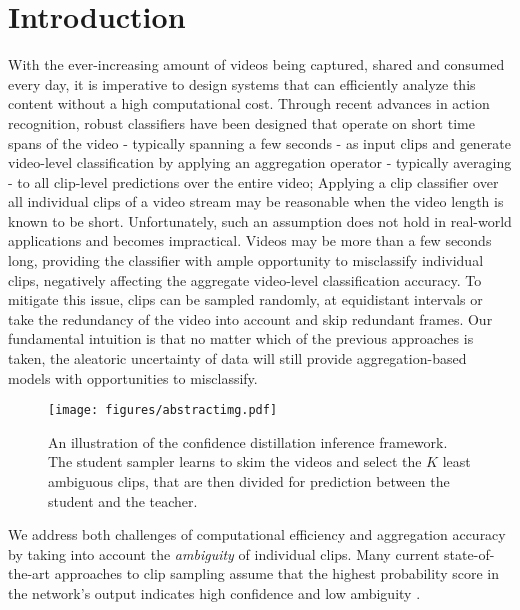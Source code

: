 \documentclass[a4paper,conference]{IEEEtran}
\begin{document}
\IEEEpeerreviewmaketitle



\section{Introduction}
With the ever-increasing amount of videos being captured, shared and consumed every day, it is imperative to design systems that can efficiently analyze this content without a high computational cost. Through recent advances in action recognition, robust classifiers have been designed \cite{Hara_2018_CVPR, tran2015learning, tran2018closer, tran2019video, feichtenhofer2017spatiotemporal, feichtenhofer2019slowfast, feichtenhofer2020x3d} that operate on short time spans of the video - typically spanning a few seconds - as input clips and generate video-level classification by applying an aggregation operator - typically averaging - to all clip-level predictions over the entire video; Applying a clip classifier over all individual clips of a video stream may be reasonable when the video length is known to be short. Unfortunately, such an assumption does not hold in real-world applications and becomes impractical. Videos may be more than a few seconds long, providing the classifier with ample opportunity to misclassify individual clips, negatively affecting the aggregate video-level classification accuracy. To mitigate this issue, clips can be sampled randomly, at equidistant intervals or take the redundancy of the video into account and skip redundant frames. Our fundamental intuition is that no matter which of the previous approaches is taken, the aleatoric uncertainty of data will still provide aggregation-based models with opportunities to misclassify. 

\begin{figure}[t] \centering
    {{\texttt{[image: figures/abstractimg.pdf]}}}\caption{An illustration of the confidence distillation inference framework. The student sampler learns to skim the videos and select the $K$ least ambiguous clips, that are then divided for prediction between the student and the teacher.}\label{fig:abstframework}
\end{figure}

We address both challenges of computational efficiency and aggregation accuracy by taking into account the \textit{ambiguity} of individual clips. Many current state-of-the-art approaches to clip sampling assume that the highest probability score in the network's output indicates high confidence and low ambiguity \cite{korbar2019scsampler, gao2020listen, wu2019adaframe}. 
\end{document}
